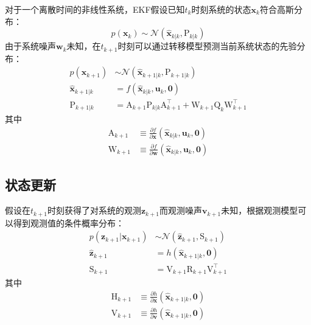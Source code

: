 对于一个离散时间的非线性系统，EKF假设已知$t_k$时刻系统的状态$\bm{x}_k$符合高斯分布：
\begin{equation}
    p(\bm{x}_k) \sim \mathcal{N}(\hat{\bm{x}}_{k|k},\mathrm{P}_{k|k})
\end{equation}
由于系统噪声$\bm{w}_k$未知，在$t_{k+1}$时刻可以通过转移模型预测当前系统状态的先验分布：
\begin{equation}
\begin{aligned}
    p(\bm{x}_{k+1}) &\sim \mathcal{N}(\hat{\bm{x}}_{k+1|k},\mathrm{P}_{k+1|k}) \\
    \hat{\bm{x}}_{k+1|k} &= f(\hat{\bm{x}}_{k|k},\bm{u}_k,\bm{0}) \\
    \mathrm{P}_{k+1|k}   &= \mathrm{A}_{k+1} \mathrm{P}_{k|k} \mathrm{A}_{k+1}^\top +
                            \mathrm{W}_{k+1} \mathrm{Q}_k\mathrm{W}_{k+1}^\top
\end{aligned}
\end{equation}
其中
\begin{equation}
\begin{aligned}
    \mathrm{A}_{k+1} &\equiv
        \frac{\partial f}
             {\partial\bm{x}}(\hat{\bm{x}}_{k|k},\bm{u}_k,\bm{0}) \\
    \mathrm{W}_{k+1} &\equiv
        \frac{\partial f}
             {\partial\bm{w}}(\hat{\bm{x}}_{k|k},\bm{u}_k,\bm{0})
\end{aligned}
\end{equation}

\subsection{状态更新}

假设在$t_{k+1}$时刻获得了对系统的观测$\bm{z}_{k+1}$而观测噪声$\bm{v}_{k+1}$未知，根据观测模型可以得到观测值的条件概率分布：
\begin{equation}
\begin{aligned}
    p(\bm{z}_{k+1}|\bm{x}_{k+1}) &\sim \mathcal{N}(\hat{\bm{z}}_{k+1}, \mathrm{S}_{k+1}) \\
    \hat{\bm{z}}_{k+1} &= h(\hat{\bm{x}}_{k+1|k},\bm{0}) \\
    \mathrm{S}_{k+1} &= \mathrm{V}_{k+1}\mathrm{R}_{k+1}\mathrm{V}_{k+1}^\top
\end{aligned}
\end{equation}
其中
\begin{equation}
\begin{aligned}
    \mathrm{H}_{k+1} &\equiv
        \frac{\partial h}
             {\partial\bm{x}}(\hat{\bm{x}}_{k+1|k},\bm{0}) \\
    \mathrm{V}_{k+1} &\equiv
        \frac{\partial h}
             {\partial\bm{v}}(\hat{\bm{x}}_{k+1|k},\bm{0})
\end{aligned}
\end{equation}

